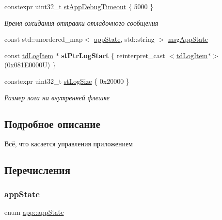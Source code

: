 \begin{DoxyCompactItemize}
constexpr uint32\+\_\+t \hyperlink{namespaceapp_a5d3e2252ee97a72dc9ab825375962ca1}{st\+App\+Debug\+Timeout} \{ 5000 \}
\begin{DoxyCompactList}\small\item\em Время ожидания отправки отладочного сообщения \end{DoxyCompactList}\item 
const std\+::unordered\+\_\+map$<$ \hyperlink{namespaceapp_a290e8080c661e52c2f685fd4af148acf}{app\+State}, std\+::string $>$ \hyperlink{namespaceapp_a5731c1034c8fb7eaa43470e10aeff84c}{msg\+App\+State}
\item 
\mbox{\label{namespaceapp_a98dd8ffbf0b01d222238c1df988adcaa}} 
const \hyperlink{structapp_1_1td_log_item}{td\+Log\+Item} $\ast$ {\bfseries st\+Ptr\+Log\+Start} \{ reinterpret\+\_\+cast $<$\hyperlink{structapp_1_1td_log_item}{td\+Log\+Item}$\ast$$>$ (0x081\+E0000\+U) \}
\item 
\mbox{\label{namespaceapp_a51952c8370b735a12cf723ced096ca48}} 
constexpr uint32\+\_\+t \hyperlink{namespaceapp_a51952c8370b735a12cf723ced096ca48}{st\+Log\+Size} \{ 0x20000 \}
\begin{DoxyCompactList}\small\item\em Размер лога на внутренней флешке \end{DoxyCompactList}\end{DoxyCompactItemize}


\subsection{Подробное описание}
Всё, что касается управления приложением 

\subsection{Перечисления}
\mbox{\label{namespaceapp_a290e8080c661e52c2f685fd4af148acf}} 
\subsubsection{\texorpdfstring{app\+State}{appState}}
{\footnotesize\ttfamily enum \hyperlink{namespaceapp_a290e8080c661e52c2f685fd4af148acf}{app\+::app\+State}}

